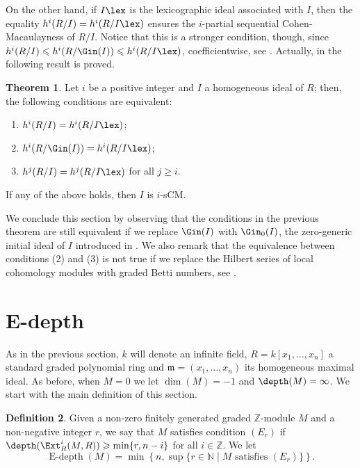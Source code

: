 \documentclass[12pt]{amsart}
\theoremstyle{definition}
\newtheorem{theorem}{Theorem}[section]
\theoremstyle{definition}
\newtheorem{definition}[theorem]{Definition}
\newcommand{\m}{\mathfrak{m}}
\def\NZQ{\mathbb}               %
\def\NN{{\NZQ N}}
\def\ZZ{{\NZQ Z}}
\renewcommand{\leq}{\leqslant}
\renewcommand{\geq}{\geqslant}
\DeclareMathOperator{\Edepth}{E-depth}
\begin{document}
\noindent
On the other hand, if $I\lex$ is the lexicographic ideal associated with $I$, then the equality $h^i(R/I) = h^i(R/I\lex)$ ensures the $i$-partial sequential Cohen-Macaulayness of $R/I$. Notice that this is a stronger condition, though, since  $h^i(R/I) \leq h^i(R/\Gin(I)) \leq h^i(R/I\lex)$, coefficientwise, see \cite[Theorems 2.4 and 5.4]{Sb01}. Actually, in \cite[Theorem 4.4]{SS17} the following result is proved.

\begin{theorem}\label{lbutnol}
Let $i$ be a positive integer and $I$ a homogeneous ideal of $R$; then, the following conditions are equivalent:
\begin{enumerate}[(1)]
\item $h^i(R/I)=h^i(R/I\lex)$; 
\item $h^i(R/\Gin(I))=h^i(R/I\lex)$; 
\item $h^j(R/I)=h^j(R/I\lex)$ for all $j\geq i$.
\end{enumerate}
If any of the above holds, then $I$ is $i$-sCM.
\end{theorem}

We conclude this section by observing that the conditions in the previous theorem are still equivalent if we replace $\Gin(I)$ with $\Gin_0(I)$, the zero-generic initial ideal of $I$ introduced in \cite{CS15}.
We also remark that the equivalence between conditions (2) and (3)  is not true if we replace the Hilbert series of local cohomology modules with graded Betti numbers, see \cite[Theorem 3.1]{MH06}.



    
\section{E-depth} \label{Section Edepth}
As in the previous section,  $k$ will denote an infinite field, $R=k[x_1,\ldots,x_n]$ a standard graded polynomial ring and $\m= (x_1,\ldots,x_n)$ its homogeneous maximal ideal. As before, when $M=0$ we let $\dim(M)=-1$ and $\depth(M)=\infty$.  We start with the main definition of this section.

\begin{definition} \label{Def E-depth} 
Given a non-zero finitely generated graded $\ZZ$-module $M$ and a non-negative integer $r$, we say that $M$ satisfies condition $(E_r)$ if  $\depth(\Ext^i_R(M,R)) \geq \min\{r,n-i\}$ for all $i \in \ZZ$. We let
\[
\Edepth(M) = \min\left\{n, \sup\{r \in \NN \mid M \text{ satisfies } (E_r)\}\right\}.
\]
\end{definition}
\end{document}
